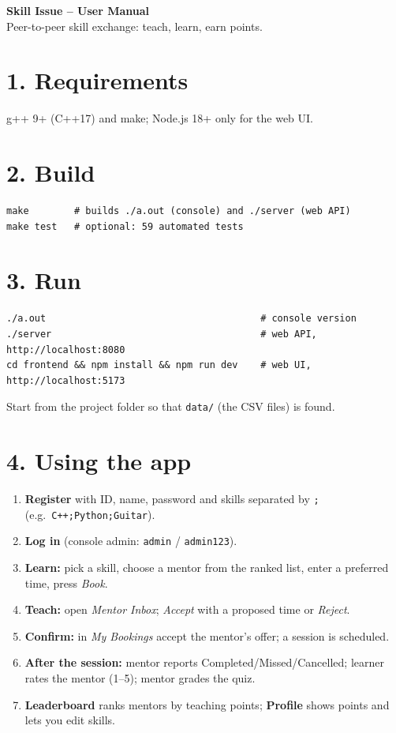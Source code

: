 \documentclass[10pt,a4paper]{article}
\begin{document}
\begin{center}{\LARGE\textbf{Skill Issue -- User Manual}}\\ Peer-to-peer skill exchange: teach, learn, earn points.\end{center}
\section*{1. Requirements}
g++ 9+ (C++17) and make; Node.js 18+ only for the web UI.
\section*{2. Build}
\begin{lstlisting}
make        # builds ./a.out (console) and ./server (web API)
make test   # optional: 59 automated tests
\end{lstlisting}
\section*{3. Run}
\begin{lstlisting}
./a.out                                      # console version
./server                                     # web API, http://localhost:8080
cd frontend && npm install && npm run dev    # web UI,  http://localhost:5173
\end{lstlisting}
Start from the project folder so that \texttt{data/} (the CSV files) is found.
\section*{4. Using the app}
\begin{enumerate}
\item \textbf{Register} with ID, name, password and skills separated by \texttt{;} (e.g.\ \texttt{C++;Python;Guitar}).
\item \textbf{Log in} (console admin: \texttt{admin} / \texttt{admin123}).
\item \textbf{Learn:} pick a skill, choose a mentor from the ranked list, enter a preferred time, press \emph{Book}.
\item \textbf{Teach:} open \emph{Mentor Inbox}; \emph{Accept} with a proposed time or \emph{Reject}.
\item \textbf{Confirm:} in \emph{My Bookings} accept the mentor's offer; a session is scheduled.
\item \textbf{After the session:} mentor reports Completed/Missed/Cancelled; learner rates the mentor (1--5); mentor grades the quiz.
\item \textbf{Leaderboard} ranks mentors by teaching points; \textbf{Profile} shows points and lets you edit skills.
\end{enumerate}
\end{document}
